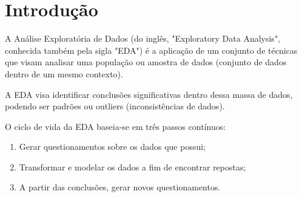 \chapter{Introdução}	

A Análise Exploratória de Dados (do inglês, "Exploratory Data Analysis", conhecida também pela sigla "EDA") é a aplicação de um conjunto de técnicas que visam analisar uma população ou amostra de dados (conjunto de dados dentro de um mesmo contexto).

A EDA visa identificar conclusões significativas dentro dessa massa de dados, podendo ser padrões ou outliers (inconsistências de dados).

O ciclo de vida da EDA baseia-se em três passos contínuos:

\begin{enumerate}
	\item Gerar questionamentos sobre os dados que possui;
	\item Transformar e modelar os dados a fim de encontrar repostas;
	\item A partir das conclusões, gerar novos questionamentos.
\end{enumerate}	


